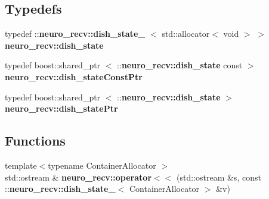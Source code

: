 \subsection*{\-Typedefs}
\begin{DoxyCompactItemize}
\item 
typedef \*
\-::{\bf neuro\-\_\-recv\-::dish\-\_\-state\-\_\-}\*
$<$ std\-::allocator$<$ void $>$ $>$ {\bf neuro\-\_\-recv\-::dish\-\_\-state}
\item 
typedef boost\-::shared\-\_\-ptr\*
$<$ \-::{\bf neuro\-\_\-recv\-::dish\-\_\-state} \*
const  $>$ {\bf neuro\-\_\-recv\-::dish\-\_\-state\-Const\-Ptr}
\item 
typedef boost\-::shared\-\_\-ptr\*
$<$ \-::{\bf neuro\-\_\-recv\-::dish\-\_\-state} $>$ {\bf neuro\-\_\-recv\-::dish\-\_\-state\-Ptr}
\end{DoxyCompactItemize}
\subsection*{\-Functions}
\begin{DoxyCompactItemize}
\item 
{\footnotesize template$<$typename Container\-Allocator $>$ }\\std\-::ostream \& {\bf neuro\-\_\-recv\-::operator$<$$<$} (std\-::ostream \&s, const \-::{\bf neuro\-\_\-recv\-::dish\-\_\-state\-\_\-}$<$ \-Container\-Allocator $>$ \&v)
\end{DoxyCompactItemize}
